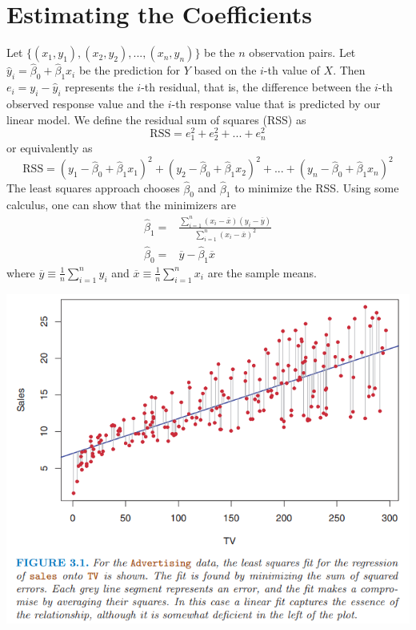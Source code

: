 \section{Estimating the Coefficients}
Let $\{(x_1, y_1), (x_2, y_2), ..., (x_n, y_n)\}$ be the $n$ observation pairs. Let $\hat{y}_i = \hat{\beta}_0 + \hat{\beta}_1 x_i$ be the prediction for $Y$ based on the $i$-th value of $X$. Then $e_i = y_i - \hat{y}_i$ represents the $i$-th residual, that is,  the difference between the $i$-th observed response value and the $i$-th response value that is predicted by our linear model. We define the residual sum of squares (RSS) as
\[\text{RSS} = e_1^2 + e_2^2 + ... + e_n^2\]
or equivalently as
\[\text{RSS} = (y_1 - \hat{\beta}_0 + \hat{\beta}_1 x_1)^2 + (y_2 - \hat{\beta}_0 + \hat{\beta}_1 x_2)^2 + ... + (y_n - \hat{\beta}_0 + \hat{\beta}_1 x_n)^2\]
The least squares approach chooses $\hat{\beta}_0$ and $\hat{\beta}_1$ to minimize the RSS. Using some calculus, one can show that the minimizers are
\[
\begin{split}
    \hat{\beta}_1 = & \frac{\sum_{i=1}^n (x_i - \overline{x}) (y_i - \overline{y})}{\sum_{i=1}^n (x_i - \overline{x})^2} \\
    \hat{\beta}_0 = & \overline{y} - \hat{\beta}_1 \overline{x}
\end{split}
\]
where $\overline{y} \equiv \frac{1}{n}\sum_{i=1}^n y_i$ and $\overline{x} \equiv \frac{1}{n}\sum_{i=1}^n x_i$ are the sample means.
\begin{center}
    \includegraphics[scale=0.8]{images/linear_reg adv.png}
\end{center}

